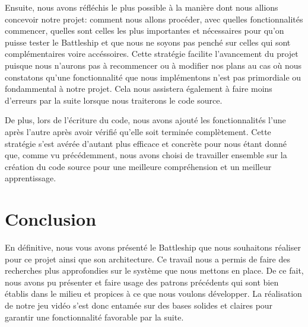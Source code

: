 \documentclass[12pt]{article}
\begin{document}
Ensuite, nous avons réfléchis le plus possible à la manière dont nous allions concevoir notre projet: comment nous allons procéder, avec quelles fonctionnalités commencer, quelles sont celles les plus importantes et nécessaires pour qu'on puisse tester le Battleship et que nous ne soyons pas penché sur celles qui sont complémentaires voire accéssoires. Cette stratégie facilite l'avancement du projet puisque nous n'aurons pas à recommencer ou à modifier nos plans au cas où nous constatons qu'une fonctionnalité que nous implémentons n'est pas primordiale ou fondammental à notre projet. Cela nous assistera également à faire moins d'erreurs par la suite lorsque nous traiterons le code source.

De plus, lors de l'écriture du code, nous avons ajouté les fonctionnalités l'une après l'autre après avoir vérifié qu'elle soit terminée complètement. Cette stratégie s'est avérée d'autant plus efficace et concrète pour nous étant donné que, comme vu précédemment, nous avons choisi de travailler ensemble sur la création du code source pour une meilleure compréhension et un meilleur apprentissage.

\section{Conclusion}

En définitive, nous vous avons présenté le Battleship que nous souhaitons réaliser pour ce projet ainsi que son architecture. Ce travail nous a permis de faire des recherches plus approfondies sur le système que nous mettons en place. De ce fait, nous avons pu présenter et faire usage des patrons précédents qui sont bien établis dans le milieu et propices à ce que nous voulons développer. La réalisation de notre jeu vidéo s'est donc entamée sur des bases solides et claires pour garantir une fonctionnalité favorable par la suite.

\newpage


\end{document}
